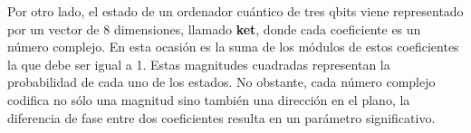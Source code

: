 \documentclass[nochap]{apuntesURJC}
\begin{document}
Por otro lado, el estado de un ordenador cuántico de tres qbits viene representado por un vector de 8 dimensiones, llamado \textbf{ket}, donde cada coeficiente es un número complejo. En esta ocasión es la suma de los módulos de estos coeficientes la que debe ser igual a 1. Estas magnitudes cuadradas representan la probabilidad de cada uno de los estados. No obstante, cada número complejo codifica no sólo una magnitud sino también una dirección en el plano, la diferencia de fase entre dos coeficientes resulta en un parámetro significativo.


%


\end{document}
